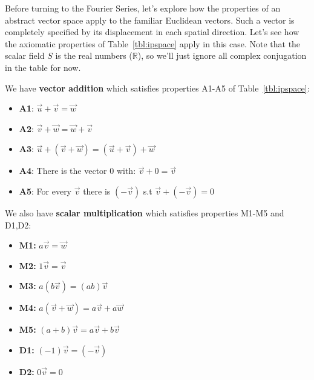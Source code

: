 \documentclass[12pt]{book}
\begin{document}
Before turning to the Fourier Series, let's explore how the properties of an abstract vector space apply to the familiar Euclidean vectors.  Such a vector is completely specified by its displacement in each spatial direction.  Let's see how the axiomatic properties of Table~\ref{tbl:ipspace} apply in this case. Note that the scalar field $S$ is the real numbers ($\mathbb{R}$), so we'll just ignore all complex conjugation in the table for now.

\begin{samepage}
We have {\bf vector addition} which satisfies properties A1-A5 of Table~\ref{tbl:ipspace}:
\begin{itemize}
\item {\bf A1}: $\vec{u} + \vec{v} = \vec{w}$ 
\item {\bf A2}: $\vec{v} + \vec{w} = \vec{w} + \vec{v}$
\item {\bf A3}: $\vec{u} + (\vec{v} + \vec{w}) = (\vec{u} + \vec{v}) + \vec{w} $
\item {\bf A4}: There is the vector 0 with: $\vec{v} + 0 = \vec{v} $
\item {\bf A5}: For every $\vec{v}$ there is $(-\vec{v})$ s.t $\vec{v} + (-\vec{v}) = 0$
\end{itemize}
\end{samepage}

\begin{samepage}
\noindent
We also have {\bf scalar multiplication} which satisfies properties M1-M5 and D1,D2:
\begin{itemize}
\item {\bf M1:} $a \vec{v} = \vec{w}$
\item {\bf M2:} $1 \vec{v} = \vec{v}$
\item {\bf M3:} $a(b\vec{v}) = (ab)\vec{v}$
\item {\bf M4:} $a(\vec{v} + \vec{w}) = a\vec{v} + a\vec{w}$
\item {\bf M5:} $(a+b)\vec{v} = a\vec{v} + b\vec{v}$
\item {\bf D1:} $(-1)\vec{v} = (-\vec{v})$
\item {\bf D2:} $0\vec{v} = 0$
\end{itemize}
\end{samepage}
\end{document}
